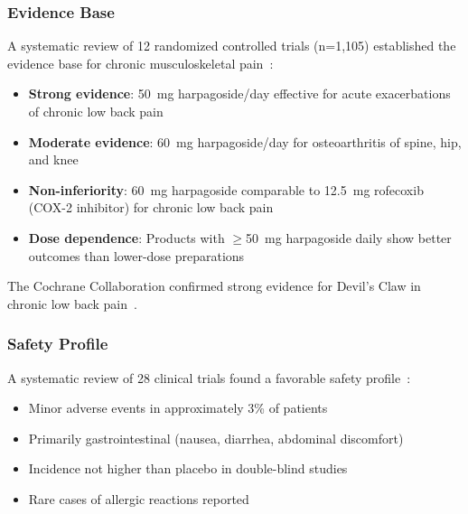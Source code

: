 \subsubsection{Evidence Base}

A systematic review of 12 randomized controlled trials (n=1,105) established the evidence base for chronic musculoskeletal pain~\cite{Gagnier2004Harpagophytum}:
\begin{itemize}
    \item \textbf{Strong evidence}: 50~mg harpagoside/day effective for acute exacerbations of chronic low back pain
    \item \textbf{Moderate evidence}: 60~mg harpagoside/day for osteoarthritis of spine, hip, and knee
    \item \textbf{Non-inferiority}: 60~mg harpagoside comparable to 12.5~mg rofecoxib (COX-2 inhibitor) for chronic low back pain
    \item \textbf{Dose dependence}: Products with $\geq$50~mg harpagoside daily show better outcomes than lower-dose preparations
\end{itemize}

The Cochrane Collaboration confirmed strong evidence for Devil's Claw in chronic low back pain~\cite{Gagnier2007Cochrane}.

\subsubsection{Safety Profile}

A systematic review of 28 clinical trials found a favorable safety profile~\cite{Vlachojannis2008HarpagophytumSafety}:
\begin{itemize}
    \item Minor adverse events in approximately 3\% of patients
    \item Primarily gastrointestinal (nausea, diarrhea, abdominal discomfort)
    \item Incidence not higher than placebo in double-blind studies
    \item Rare cases of allergic reactions reported
\end{itemize}

